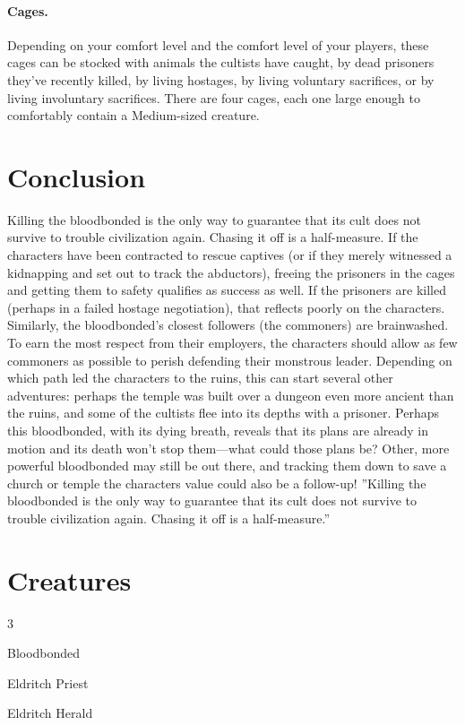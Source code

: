 \documentclass[10pt,a4paper,twoside,twocolumn,openany,bg=print,nodeprecatedcode]{dndbook}
\begin{document}
\paragraph{Cages.}
Depending on your comfort level and the comfort level of your players, these cages can be stocked with animals the cultists have caught, by dead prisoners they've recently killed, by living hostages, by living voluntary sacrifices, or by living involuntary sacrifices. There are four cages, each one large enough to comfortably contain a Medium-sized creature.
\section{Conclusion}
Killing the bloodbonded is the only way to guarantee that its cult does not survive to trouble civilization again. Chasing it off is a half-measure. If the characters have been contracted to rescue captives (or if they merely witnessed a kidnapping and set out to track the abductors), freeing the prisoners in the cages and getting them to safety qualifies as success as well. If the prisoners are killed (perhaps in a failed hostage negotiation), that reflects poorly on the characters. Similarly, the bloodbonded's closest followers (the commoners) are brainwashed. To earn the most respect from their employers, the characters should allow as few commoners as possible to perish defending their monstrous leader.
Depending on which path led the characters to the ruins, this can start several other adventures: perhaps the temple was built over a dungeon even more ancient than the ruins, and some of the cultists flee into its depths with a prisoner. Perhaps this bloodbonded, with its dying breath, reveals that its plans are already in motion and its death won't stop them—what could those plans be? Other, more powerful bloodbonded may still be out there, and tracking them down to save a church or temple the characters value could also be a follow-up!
\DndQuote%
{}
{''Killing the bloodbonded is the only way to guarantee that its cult does not survive to trouble civilization again. Chasing it off is a half-measure.''}
{}
\section{Creatures}

\begin{itemize}
\begin{multicols}{3}
\item Bloodbonded
\item Eldritch Priest
\item Eldritch Herald
\end{multicols}

\end{itemize}
\end{document}
